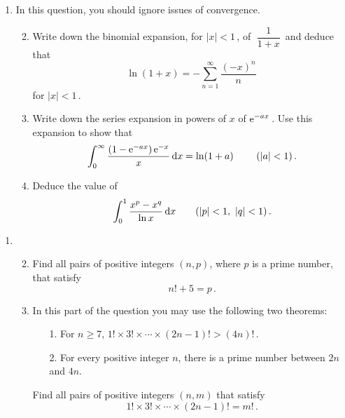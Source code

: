 \documentclass[a4, 11pt]{report}
\newlength{\qspace}
\newcounter{qnumber}
\newenvironment{question}%
 {\vspace{\qspace}
  \begin{enumerate}[\bfseries 1\quad][10]%
    \setcounter{enumi}{\value{qnumber}}%
    \item%
 }
{
  \end{enumerate}
  \filbreak
  \stepcounter{qnumber}
 }
\newenvironment{questionparts}[1][1]%
 {
  \begin{enumerate}[\bfseries (i)]%
    \setcounter{enumii}{#1}
    \addtocounter{enumii}{-1}
    \setlength{\itemsep}{5mm}
    \setlength{\parskip}{5pt}
 }
 {
  \end{enumerate}
 }
\def\d{{\rm d}}
\def\e{{\rm e}}
\def\ge{\geqslant}
\begin{document}
\begin{question}

In this question, you should ignore issues of convergence.

\begin{questionparts}
\item Write down the binomial expansion, for $\vert x \vert<1\,$, of 
$\;\dfrac{1}{1+x}\,$ and deduce that
\[
\displaystyle
\ln (1+x) = -\sum_{n=1}^\infty \frac {(-x)^n}n
\,
\]
 for $\vert x \vert <1 \,$.
\item Write down the series expansion in powers of $x$ of 
$\displaystyle \e^{-ax}\,$.
Use this expansion to  show that 
\[
\int_0^\infty \frac {\left(1- \e^{-ax}\right)\e^{-x}}x
\,\d x = \ln(1+a)
\ \ \ \ \ \ \ (\vert a \vert <1)\,.
\]
\item
Deduce the value of  
\[
\int_0^1 \frac{x^p - x^q}{\ln x} \, \d x
\ \ \ \ \ \ (\vert p\vert <1, \ \vert q\vert <1)
\,.
\]
\end{questionparts}


\end{question}


\begin{question}
\begin{questionparts}
\item
Find all pairs of positive integers $(n,p)$, where $p$ is
a prime number,
that satisfy
\[
n!+ 5 =p
\,.
\]

\item
In this part of the 
question you may use the following two theorems:
\begin{enumerate}
\item[1.] 
For $n\ge 7$, 
$1! \times 3! \times \cdots \times (2n-1)! > (4n)!\,$.
\item [2.] For every positive integer
$n$, there is a prime number between $2n$ and $4n$.
\end{enumerate}

Find all pairs of positive integers $(n,m)$ that satisfy 
\[
1! \times 3! \times \cdots \times (2n-1)! = m! \,.
\]


\end{questionparts}
\end{question}
\end{document}
